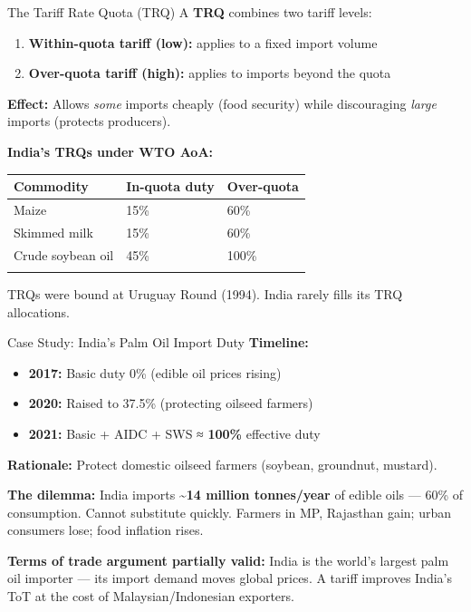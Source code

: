 \documentclass[
  ignorenonframetext,
  aspectratio=169,
]{beamer}
\makeatletter
\providecommand{\tightlist}{%
  \setlength{\itemsep}{0pt}\setlength{\parskip}{0pt}}
\let\quarto@originallabel\label
\DeclareRobustCommand*{\label}[1]{\quarto@originallabel{#1}}
\makeatother
\begin{document}
\begin{frame}{The Tariff Rate Quota (TRQ)}
\label{the-tariff-rate-quota-trq}
A \textbf{TRQ} combines two tariff levels:

\begin{enumerate}
\tightlist
\item
  \textbf{Within-quota tariff (low):} applies to a fixed import volume
\item
  \textbf{Over-quota tariff (high):} applies to imports beyond the quota
\end{enumerate}

\textbf{Effect:} Allows \emph{some} imports cheaply (food security)
while discouraging \emph{large} imports (protects producers).

\textbf{India's TRQs under WTO AoA:}

\begin{longtable}[]{@{}lll@{}}
\toprule\noalign{}
Commodity & In-quota duty & Over-quota \\
\midrule\noalign{}
\endhead
Maize & 15\% & 60\% \\
Skimmed milk & 15\% & 60\% \\
Crude soybean oil & 45\% & 100\% \\
\bottomrule\noalign{}
\end{longtable}

TRQs were bound at Uruguay Round (1994). India rarely fills its TRQ
allocations.
\end{frame}

\begin{frame}{Case Study: India's Palm Oil Import Duty}
\label{case-study-indias-palm-oil-import-duty}
\textbf{Timeline:}

\begin{itemize}
\tightlist
\item
  \textbf{2017:} Basic duty 0\% (edible oil prices rising)
\item
  \textbf{2020:} Raised to 37.5\% (protecting oilseed farmers)
\item
  \textbf{2021:} Basic + AIDC + SWS ≈ \textbf{100\%} effective duty
\end{itemize}

\textbf{Rationale:} Protect domestic oilseed farmers (soybean,
groundnut, mustard).

\textbf{The dilemma:} India imports \textbf{\textasciitilde14 million
tonnes/year} of edible oils --- 60\% of consumption. Cannot substitute
quickly. Farmers in MP, Rajasthan gain; urban consumers lose; food
inflation rises.

\textbf{Terms of trade argument partially valid:} India is the world's
largest palm oil importer --- its import demand moves global prices. A
tariff improves India's ToT at the cost of Malaysian/Indonesian
exporters.
\end{frame}
\end{document}
